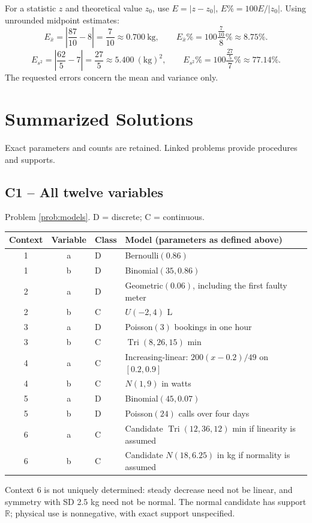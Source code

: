For a statistic $z$ and theoretical value $z_0$, use $E=|z-z_0|$, $E\%=100E/|z_0|$.
Using unrounded midpoint estimates:
\[E_{\bar x}=\left|\frac{87}{10}-8\right|=\frac{7}{10}\approx0.700\ \mathrm{kg},\qquad E_{\bar x}\%=100\frac{\frac{7}{10}}{8}\%\approx8.75\%.\]
\[E_{s^2}=\left|\frac{62}{5}-7\right|=\frac{27}{5}\approx5.400\ (\mathrm{kg})^2,\qquad E_{s^2}\%=100\frac{\frac{27}{5}}{7}\%\approx77.14\%.\]
The requested errors concern the mean and variance only.

\clearpage\section{Summarized Solutions}\label{sec:summary}
Exact parameters and counts are retained. Linked problems provide procedures and supports.
\subsection*{C1 -- All twelve variables}
Problem \ref{prob:models}. D = discrete; C = continuous.
\begin{center}\begin{tabular}{ccll}
\toprule Context&Variable&Class&Model (parameters as defined above)\\\midrule
1&a&D&Bernoulli$(0.86)$\\
1&b&D&Binomial$(35,0.86)$\\
2&a&D&Geometric$(0.06)$, including the first faulty meter\\
2&b&C&$U(-2,4)$ L\\
3&a&D&Poisson$(3)$ bookings in one hour\\
3&b&C&$\operatorname{Tri}(8,26,15)$ min\\
4&a&C&Increasing-linear: $200(x-0.2)/49$ on $[0.2,0.9]$\\
4&b&C&$N(1,9)$ in watts\\
5&a&D&Binomial$(45,0.07)$\\
5&b&D&Poisson$(24)$ calls over four days\\
6&a&C&Candidate $\operatorname{Tri}(12,36,12)$ min if linearity is assumed\\
6&b&C&Candidate $N(18,6.25)$ in kg if normality is assumed\\\bottomrule
\end{tabular}\end{center}
Context 6 is not uniquely determined: steady decrease need not be linear, and symmetry with SD 2.5 kg need not be normal. The normal candidate has support $\mathbb R$; physical use is nonnegative, with exact support unspecified.
